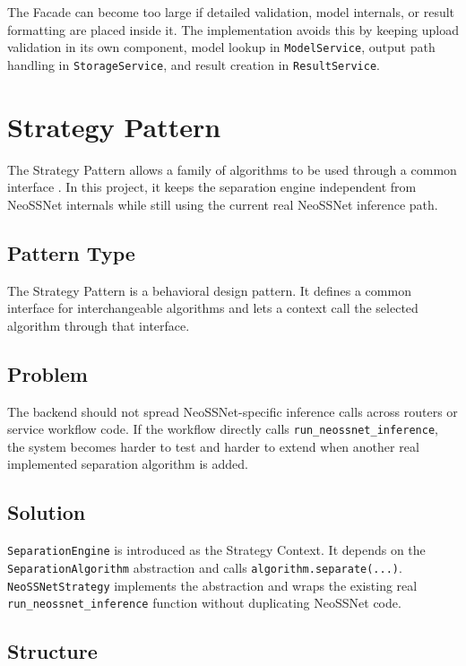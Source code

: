 The Facade can become too large if detailed validation, model internals, or result formatting are placed inside it. The implementation avoids this by keeping upload validation in its own component, model lookup in \texttt{ModelService}, output path handling in \texttt{StorageService}, and result creation in \texttt{ResultService}.

\section{Strategy Pattern}

The Strategy Pattern allows a family of algorithms to be used through a common interface \parencite{gamma1994designpatterns}. In this project, it keeps the separation engine independent from NeoSSNet internals while still using the current real NeoSSNet inference path.

\subsection{Pattern Type}

The Strategy Pattern is a behavioral design pattern. It defines a common interface for interchangeable algorithms and lets a context call the selected algorithm through that interface.

\subsection{Problem}

The backend should not spread NeoSSNet-specific inference calls across routers or service workflow code. If the workflow directly calls \texttt{run\_neossnet\_inference}, the system becomes harder to test and harder to extend when another real implemented separation algorithm is added.

\subsection{Solution}

\texttt{SeparationEngine} is introduced as the Strategy Context. It depends on the \texttt{SeparationAlgorithm} abstraction and calls \texttt{algorithm.separate(...)}. \texttt{NeoSSNetStrategy} implements the abstraction and wraps the existing real \texttt{run\_neossnet\_inference} function without duplicating NeoSSNet code.

\subsection{Structure}

